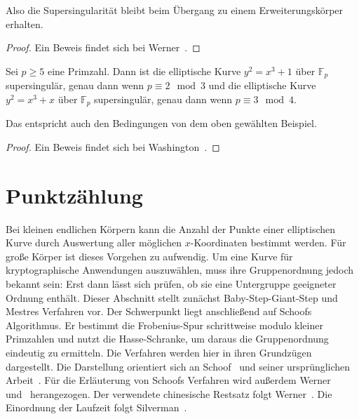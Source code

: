 Also die Supersingularität bleibt beim Übergang zu einem Erweiterungskörper erhalten.
\begin{proof}
    Ein Beweis findet sich bei Werner~\cite[Lemma~3.4.2, S.~66--68]{werner02}.
\end{proof}
\begin{lemma}
    Sei $p\geq 5$ eine Primzahl. Dann ist die elliptische Kurve $y^2=x^3+1$ über $\mathbb{F}_p$ supersingulär, genau dann wenn $p\equiv 2 \mod 3$ und die elliptische Kurve $y^2=x^3+x$ über $\mathbb{F}_p$ supersingulär, genau dann wenn $p\equiv 3 \mod 4$.
\end{lemma}
Das entspricht auch den Bedingungen von dem oben gewählten Beispiel.
\begin{proof}
    Ein Beweis findet sich bei Washington~\cite[Proposition~4.37, S.~135]{washington08}.
\end{proof}

\section{Punktzählung}
Bei kleinen endlichen Körpern kann die Anzahl der Punkte einer elliptischen Kurve durch Auswertung aller möglichen $x$-Koordinaten bestimmt werden. Für große Körper ist dieses Vorgehen zu aufwendig. Um eine Kurve für kryptographische Anwendungen auszuwählen, muss ihre Gruppenordnung jedoch bekannt sein: Erst dann lässt sich prüfen, ob sie eine Untergruppe geeigneter Ordnung enthält. Dieser Abschnitt stellt zunächst Baby-Step-Giant-Step und Mestres Verfahren vor. Der Schwerpunkt liegt anschließend auf Schoofs Algorithmus. Er bestimmt die Frobenius-Spur schrittweise modulo kleiner Primzahlen und nutzt die
Hasse-Schranke, um daraus die Gruppenordnung eindeutig zu ermitteln. Die Verfahren werden hier in ihren Grundzügen dargestellt. Die Darstellung orientiert sich an Schoof~\cite[S.~219--228, 233--235]{schoof95} und seiner ursprünglichen Arbeit~\cite{schoof85}. Für die Erläuterung von Schoofs Verfahren wird außerdem Werner~\cite[S.~63--65]{werner02} und~\cite[S.~101, 123--127]{washington08} herangezogen. Der verwendete chinesische Restsatz folgt Werner~\cite[S.~115--116]{werner02}. Die Einordnung der Laufzeit folgt Silverman~\cite[S.~46]{silverman06}.

